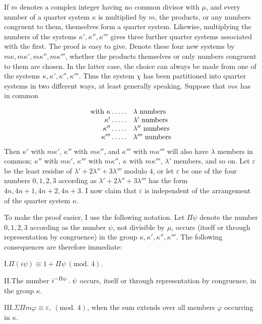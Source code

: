 If $m$ denotes a complex integer having no common divisor with $\mu$, and every number of a quarter system $\kappa$ is multiplied by $m$, the products, or any numbers congruent to them, themselves form a quarter system. Likewise, multiplying the numbers of the systems $\kappa',\kappa'',\kappa'''$ gives three further quarter systems associated with the first. The proof is easy to give. Denote these four new systems by $m\kappa,m\kappa',m\kappa'',m\kappa'''$, whether the products themselves or only numbers congruent to them are chosen. In the latter case, the choice can always be made from one of the systems $\kappa,\kappa',\kappa'',\kappa'''$. Thus the system $\chi$ has been partitioned into quarter systems in two different ways, at least generally speaking. Suppose that $m\kappa$ has in common

\[
\begin{array}{rl}
\text{with }\kappa\mathinner{.\,.\,.\,.\,.}&\lambda\text{ numbers}\\
\kappa'\mathinner{.\,.\,.\,.\,.}&\lambda'\text{ numbers}\\
\kappa''\mathinner{.\,.\,.\,.\,.}&\lambda''\text{ numbers}\\
\kappa'''\mathinner{.\,.\,.\,.\,.}&\lambda'''\text{ numbers}
\end{array}
\]
Then $\kappa'$ with $m\kappa'$, $\kappa''$ with $m\kappa''$, and $\kappa'''$ with $m\kappa'''$ will also have $\lambda$ members in common;
$\kappa''$ with $m\kappa'$, $\kappa'''$ with $m\kappa''$, $\kappa$ with $m\kappa'''$, $\lambda'$ members, and so on. Let $\varepsilon$ be the least residue of $\lambda'+2\lambda''+3\lambda'''$ modulo $4$, or let $\varepsilon$ be one of the four numbers $0,1,2,3$ according as $\lambda'+2\lambda''+3\lambda'''$ has the form $4n,4n+1,4n+2,4n+3$. I now claim that $\varepsilon$ is independent of the arrangement of the quarter system $\kappa$.

To make the proof easier, I use the following notation. Let $\Pi\psi$ denote the number $0,1,2,3$ according as the number $\psi$, not divisible by $\mu$, occurs (itself or through representation by congruence) in the group $\kappa,\kappa',\kappa'',\kappa'''$. The following consequences are therefore immediate:

I.\quad $\Pi(i\psi)\equiv1+\Pi\psi\ (\text{mod. }4)$.

II.\quad The number $i^{-\Pi\psi}\mathbin{.}\psi$ occurs, itself or through representation by congruence, in the group $\kappa$.

III.\quad $\Sigma\Pi m\varphi\equiv\varepsilon,\ (\text{mod. }4)$, when the sum extends over all members $\varphi$ occurring in $\kappa$.

